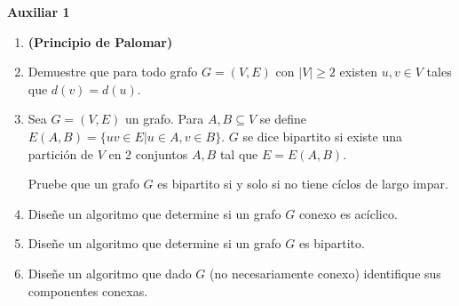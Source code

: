 

\header
\begin{center}
	\LARGE \bf{Auxiliar 1}
\end{center}

\begin{enumerate}[label ={\bf P\arabic*}]
	\item \textbf{(Principio de Palomar)}
	
	\item Demuestre que para todo grafo $G = (V,E)$ con $|V|\geq 2$ existen $u,v\in V$ tales que $d(v)=d(u)$.
	
	\item Sea  $G = (V,E)$ un grafo. Para $A, B \subseteq V$ se define $E(A,B) = \{uv \in E | u\in A, v\in B\}$.
		$G$ se dice bipartito si existe una partición de $V$ en 2 conjuntos $A, B$ tal que $E = E(A,B)$.

		Pruebe que un grafo $G$ es bipartito si y solo si no tiene cíclos de largo impar.

	\item Diseñe un algoritmo que determine si un grafo $G$ conexo es acíclico.
	\item Diseñe un algoritmo que determine si un grafo $G$ es bipartito.
	\item Diseñe un algoritmo que dado $G$ (no necesariamente conexo) identifique sus componentes conexas.


\end{enumerate}
